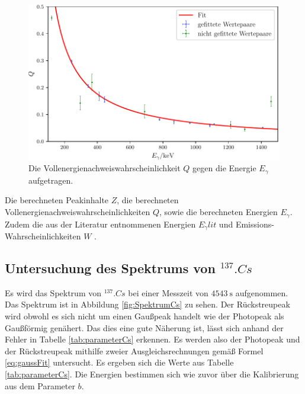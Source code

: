 \begin{figure}
	\centering
	\includegraphics[width=\linewidth-70pt,height=\textheight-70pt,keepaspectratio]{content/images/Q.pdf}
	\caption{Die Vollenergienachweiswahrscheinlichkeit $Q$ gegen die Energie $E_\gamma$ aufgetragen.}
	\label{fig:Q}
\end{figure}

\begin{table}
	\centering
	\caption{Die berechneten Peakinhalte $Z$, die berechneten Vollenergienachweiswahrscheinlichkeiten $Q$, sowie die berechneten Energien $E_\gamma$. Zudem die aus der Literatur entnommenen Energien $E_\gamma^.{lit}$ und Emissions-Wahrscheinlichkeiten $W$ \cite{MARTIN20131497}.}
	
	\label{tab:Q}
\end{table}

\subsection{Untersuchung des Spektrums von $^{137}.{Cs}$}

Es wird das Spektrum von $^{137}.{Cs}$ bei einer Messzeit von $\SI{4543}{\second}$ aufgenommen. Das Spektrum ist in Abbildung \ref{fig:SpektrumCs} zu sehen. Der Rückstreupeak wird obwohl es sich nicht um einen Gaußpeak handelt wie der Photopeak als Gaußförmig genähert. Das dies eine gute Näherung ist, lässt sich anhand der Fehler in Tabelle \ref{tab:parameterCs} erkennen. Es werden also der Photopeak und der Rückstreupeak mithilfe zweier Ausgleichsrechnungen gemäß Formel \eqref{eq:gaussFit} untersucht. Es ergeben sich die Werte aus Tabelle \ref{tab:parameterCs}. Die Energien bestimmen sich wie zuvor über die Kalibrierung aus dem Parameter $b$.    

